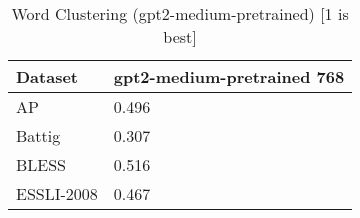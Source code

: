 \begin{table}[]
\centering
\begin{tabular}{l|l}
\hline
Dataset & gpt2-medium-pretrained 768 \\
\hline
AP & 0.496 \\ 
Battig & 0.307 \\ 
BLESS & 0.516 \\ 
ESSLI-2008 & 0.467
\end{tabular}
\caption{Word Clustering (gpt2-medium-pretrained) [1 is best]}
\label{tab:cluster-gpt2-medium-pretrained}
\end{table}
